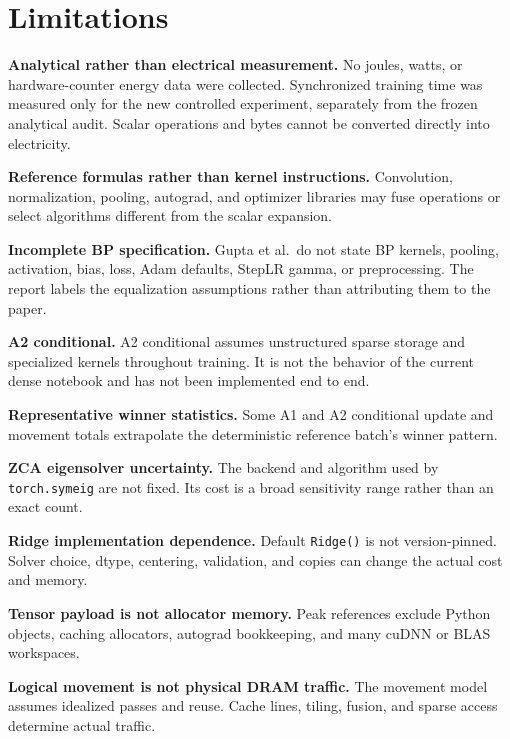 \documentclass{article}
\begin{document}
    \section{Limitations}
    
    \begin{enumerate}[noitemsep]
    {\color{red}\item \textbf{Analytical rather than electrical measurement.} No joules, watts, or hardware-counter energy data were collected. Synchronized training time was measured only for the new controlled experiment, separately from the frozen analytical audit. Scalar operations and bytes cannot be converted directly into electricity.}
    \item \textbf{Reference formulas rather than kernel instructions.} Convolution, normalization, pooling, autograd, and optimizer libraries may fuse operations or select algorithms different from the scalar expansion.
    \item \textbf{Incomplete BP specification.} Gupta et al.\ do not state BP kernels, pooling, activation, bias, loss, Adam defaults, StepLR gamma, or preprocessing. The report labels the equalization assumptions rather than attributing them to the paper.
    \item \textbf{A2 conditional.} A2 conditional assumes unstructured sparse storage and specialized kernels throughout training. It is not the behavior of the current dense notebook and has not been implemented end to end.
    \item \textbf{Representative winner statistics.} Some A1 and A2 conditional update and movement totals extrapolate the deterministic reference batch's winner pattern.
    \item \textbf{ZCA eigensolver uncertainty.} The backend and algorithm used by \texttt{torch.symeig} are not fixed. Its cost is a broad sensitivity range rather than an exact count.
    \item \textbf{Ridge implementation dependence.} Default \texttt{Ridge()} is not version-pinned. Solver choice, dtype, centering, validation, and copies can change the actual cost and memory.
    \item \textbf{Tensor payload is not allocator memory.} Peak references exclude Python objects, caching allocators, autograd bookkeeping, and many cuDNN or BLAS workspaces.
    \item \textbf{Logical movement is not physical DRAM traffic.} The movement model assumes idealized passes and reuse. Cache lines, tiling, fusion, and sparse access determine actual traffic.

\end{enumerate}
\end{document}
